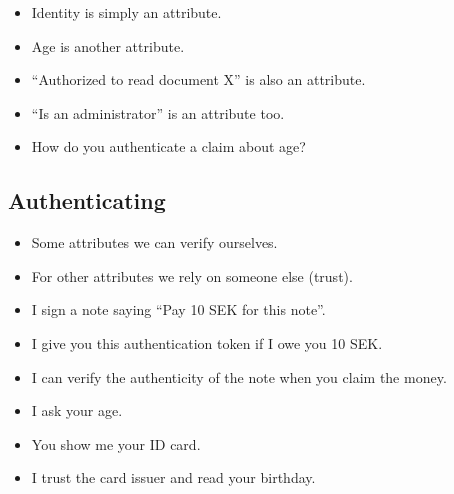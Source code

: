 \begin{frame}
  \begin{example}
    \begin{itemize}
      \item Identity is simply an attribute.
      \item Age is another attribute.
      \item \enquote{Authorized to read document X} is also an attribute.
      \item \enquote{Is an administrator} is an attribute too.
    \end{itemize}
  \end{example}
\end{frame}

\begin{frame}
  \begin{exercise}
    \begin{itemize}
      \item How do you authenticate a claim about age?
    \end{itemize}
  \end{exercise}
\end{frame}

\subsection{Authenticating}

\begin{frame}
  \begin{itemize}
    \item Some attributes we can verify ourselves.
    \item For other attributes we rely on someone else (\ie trust).
  \end{itemize}
\end{frame}

\begin{frame}
  \begin{example}
    \begin{itemize}
      \item I sign a note saying \enquote{Pay 10 SEK for this note}.
      \item I give you this authentication token if I owe you 10 SEK.
      \item I can verify the authenticity of the note when you claim the money.
    \end{itemize}
  \end{example}

  \pause

  \begin{example}
    \begin{itemize}
      \item I ask your age.
      \item You show me your ID card.
      \item I trust the card issuer and read your birthday.
    \end{itemize}
  \end{example}
\end{frame}

